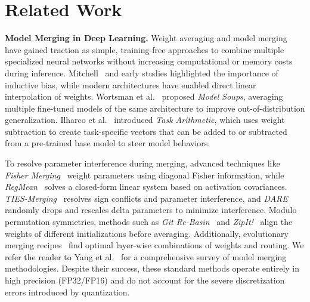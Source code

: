 \section{Related Work}
\label{sec:related_work}

\textbf{Model Merging in Deep Learning.} 
Weight averaging and model merging have gained traction as simple, training-free approaches to combine multiple specialized neural networks without increasing computational or memory costs during inference. Mitchell~\cite{mitchell80} and early studies highlighted the importance of inductive bias, while modern architectures have enabled direct linear interpolation of weights. Wortsman et al.~\cite{wortsman22} proposed \emph{Model Soups}, averaging multiple fine-tuned models of the same architecture to improve out-of-distribution generalization. Ilharco et al.~\cite{ilharco22} introduced \emph{Task Arithmetic}, which uses weight subtraction to create task-specific vectors that can be added to or subtracted from a pre-trained base model to steer model behaviors. 

To resolve parameter interference during merging, advanced techniques like \emph{Fisher Merging}~\cite{matena2022merging} weight parameters using diagonal Fisher information, while \emph{RegMean}~\cite{jin2023dataless} solves a closed-form linear system based on activation covariances. \emph{TIES-Merging}~\cite{yadav2023ties} resolves sign conflicts and parameter interference, and \emph{DARE}~\cite{yu2024language} randomly drops and rescales delta parameters to minimize interference. Modulo permutation symmetries, methods such as \emph{Git Re-Basin}~\cite{ainsworth2023git} and \emph{ZipIt!}~\cite{stoica2023zipit} align the weights of different initializations before averaging. Additionally, evolutionary merging recipes~\cite{akiba2025evolutionary} find optimal layer-wise combinations of weights and routing. We refer the reader to Yang et al.~\cite{yang2026ModelMergingSurvey} for a comprehensive survey of model merging methodologies. Despite their success, these standard methods operate entirely in high precision (FP32/FP16) and do not account for the severe discretization errors introduced by quantization.

